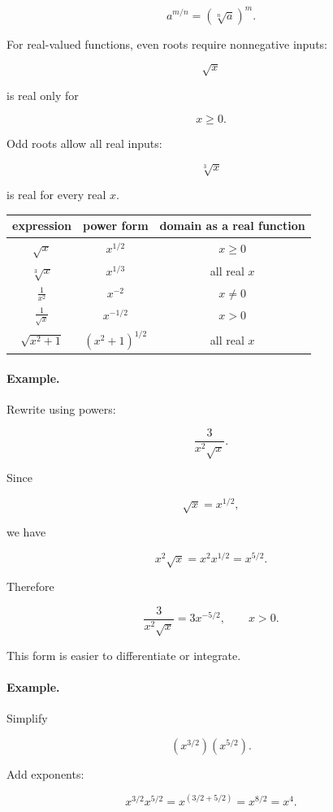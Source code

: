 \[
\boxed{
a^{m/n}=\left(\sqrt[n]{a}\right)^m.
}
\]

For real-valued functions, even roots require nonnegative inputs:

\[
\sqrt{x}
\]

is real only for

\[
x\ge0.
\]

Odd roots allow all real inputs:

\[
\sqrt[3]{x}
\]

is real for every real \(x\).

\begin{center}
\renewcommand{\arraystretch}{1.6}
\begin{tabular}{c|c|c}
\textbf{expression} & \textbf{power form} & \textbf{domain as a real function} \\ \hline
\(\sqrt{x}\) & \(x^{1/2}\) & \(x\ge0\) \\
\(\sqrt[3]{x}\) & \(x^{1/3}\) & all real \(x\) \\
\(\displaystyle \frac1{x^2}\) & \(x^{-2}\) & \(x\neq0\) \\
\(\displaystyle \frac1{\sqrt{x}}\) & \(x^{-1/2}\) & \(x>0\) \\
\(\sqrt{x^2+1}\) & \((x^2+1)^{1/2}\) & all real \(x\)
\end{tabular}
\end{center}

\paragraph{Example.}
Rewrite using powers:

\[
\frac{3}{x^2\sqrt{x}}.
\]

Since

\[
\sqrt{x}=x^{1/2},
\]

we have

\[
x^2\sqrt{x}=x^2x^{1/2}=x^{5/2}.
\]

Therefore

\[
\boxed{
\frac{3}{x^2\sqrt{x}}=3x^{-5/2},
\qquad x>0.
}
\]

This form is easier to differentiate or integrate.

\paragraph{Example.}
Simplify

\[
(x^{3/2})(x^{5/2}).
\]

Add exponents:

\[
x^{3/2}x^{5/2}=x^{(3/2+5/2)}=x^{8/2}=x^4.
\]

